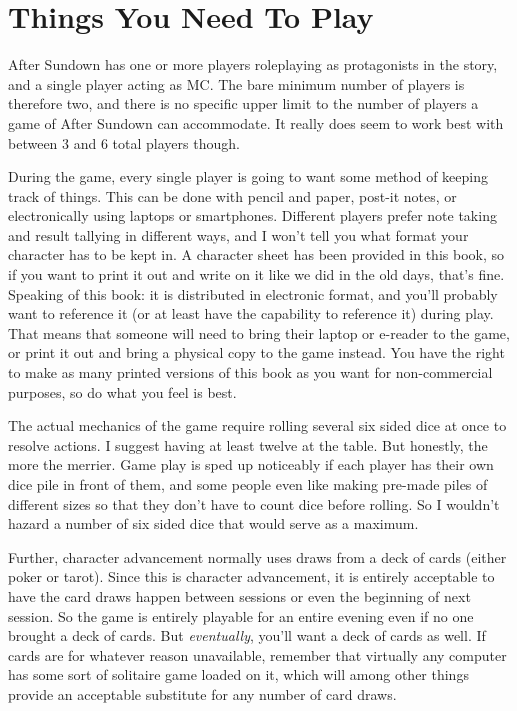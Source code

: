 \section{Things You Need To Play}

After Sundown has one or more players roleplaying as protagonists in the story, and a single player acting as MC. The bare minimum number of players is therefore two, and there is no specific upper limit to the number of players a game of After Sundown can accommodate. It really does seem to work best with between 3 and 6 total players though.

During the game, every single player is going to want some method of keeping track of things. This can be done with pencil and paper, post-it notes, or electronically using laptops or smartphones. Different players prefer note taking and result tallying in different ways, and I won't tell you what format your character has to be kept in. A character sheet has been provided in this book, so if you want to print it out and write on it like we did in the old days, that's fine. Speaking of this book: it is distributed in electronic format, and you'll probably want to reference it (or at least have the capability to reference it) during play. That means that someone will need to bring their laptop or e-reader to the game, or print it out and bring a physical copy to the game instead. You have the right to make as many printed versions of this book as you want for non-commercial purposes, so do what you feel is best.

The actual mechanics of the game require rolling several six sided dice at once to resolve actions. I suggest having at least twelve at the table. But honestly, the more the merrier. Game play is sped up noticeably if each player has their own dice pile in front of them, and some people even like making pre-made piles of different sizes so that they don't have to count dice before rolling. So I wouldn't hazard a number of six sided dice that would serve as a maximum. 

Further, character advancement normally uses draws from a deck of cards (either poker or tarot). Since this is character advancement, it is entirely acceptable to have the card draws happen between sessions or even the beginning of next session. So the game is entirely playable for an entire evening even if no one brought a deck of cards. But \textit{eventually}, you'll want a deck of cards as well. If cards are for whatever reason unavailable, remember that virtually any computer has some sort of solitaire game loaded on it, which will among other things provide an acceptable substitute for any number of card draws.

